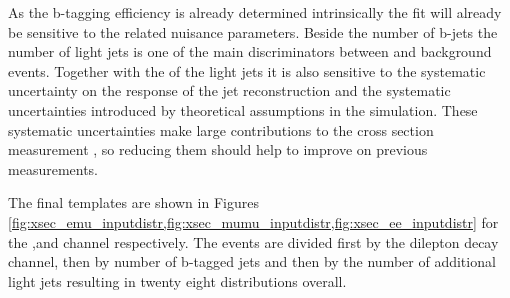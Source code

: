 As the b-tagging efficiency is already determined intrinsically the fit will already be sensitive to the related nuisance parameters.
Beside the number of b-jets the number of light jets is one of the main discriminators between \ttbar and background events.
Together with the \pt of the light jets it is also sensitive to the systematic uncertainty on the response of the jet reconstruction and
the systematic uncertainties introduced by theoretical assumptions in the simulation.
These systematic uncertainties make large contributions to the \ttbar cross section measurement , so reducing
them should help to improve on previous measurements.

The final templates are shown in Figures \ref{fig:xsec_emu_inputdistr,fig:xsec_mumu_inputdistr,fig:xsec_ee_inputdistr} for the \emu,\mumu and \ee channel respectively. The events are divided first by the dilepton decay channel, then by number of b-tagged jets and 
then by the number of additional light jets resulting in twenty eight distributions overall.

